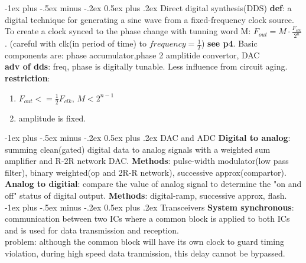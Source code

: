 \documentclass[10pt,landscape]{article}
\makeatletter
\renewcommand{\section}{\@startsection{section}{1}{0mm}%
                                {-1ex plus -.5ex minus -.2ex}%
                                {0.5ex plus .2ex}%
                                {\normalfont\large\bfseries}}
\theoremstyle{definition}
\makeatother
\begin{document}
\begin{multicols}{3}
\section{Direct digital synthesis(DDS)}
\textbf{def}: a digital technique for generating a sine wave from a fixed-frequency clock source.\\
To create a clock synced to the phase change with tunning word M: $F_{out} = M \cdot \frac{F_{clk}}{2^n}$. (careful with clk(in period of time) to $frequency = \frac{1}{T}$) \textbf{see p4}. Basic components are: phase accumulator,phase 2 amplitide convertor, DAC \\ 
\textbf{adv of dds}: freq, phase is digitally tunable. Less influence from circuit aging. 
\textbf{restriction}: 
\begin{enumerate}
    \item $F_{out} <= \frac{1}{2}F_{clk}$, $M < 2^{n-1}$
    \item amplitude is fixed.
\end{enumerate}


\section{DAC and ADC}
\textbf{Digital to analog}: summing clean(gated) digital data to analog signals with a weighted sum amplifier and R-2R network DAC. \textbf{Methods}: pulse-width modulator(low pass filter), binary weighted(op and 2R-R network), successive approx(compartor). \\
\textbf{Analog to digitial}: compare the value of analog signal to determine the "on and off" status of digital output. \textbf{Methods}: digital-ramp, successive approx, flash.\\

\section{Transceivers}
\textbf{System synchronous}: communication between two ICs where a common block is applied to both ICs and is used for data transmission and reception. \\

problem: although the common block will have its own clock to guard timing violation, during high speed data tranmission, this delay cannot be bypassed. \\


\end{multicols}
\end{document}
